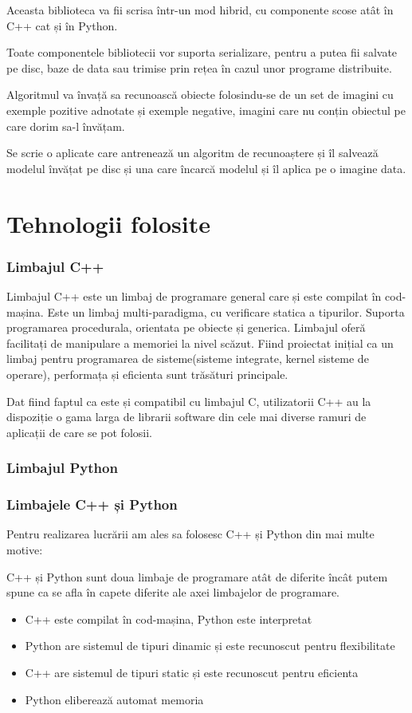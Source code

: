 Aceasta biblioteca va fii scrisa într-un mod hibrid, cu componente scose atât în C++ cat și în Python.

Toate componentele bibliotecii vor suporta serializare, pentru a putea fii salvate pe disc, baze de data sau trimise prin rețea în cazul unor programe distribuite.

Algoritmul va învață sa recunoască obiecte folosindu-se de un set de imagini cu exemple pozitive adnotate și exemple negative, imagini care nu conțin obiectul pe care dorim sa-l învățam.

Se scrie o aplicate care antrenează un algoritm de recunoaștere și îl salvează modelul învățat pe disc și una care încarcă modelul și îl aplica pe o imagine data.


\section{Tehnologii folosite}

\subsubsection{Limbajul C++}

Limbajul C++ este un limbaj de programare general care și este compilat în cod-mașina.
Este un limbaj multi-paradigma, cu verificare statica a tipurilor. 
Suporta programarea procedurala, orientata pe obiecte și generica.
Limbajul oferă facilitați de manipulare a memoriei la nivel scăzut.
Fiind proiectat inițial ca un limbaj pentru programarea de sisteme(sisteme integrate, kernel sisteme de operare), performața și eficienta sunt trăsături principale.

Dat fiind faptul ca este și compatibil cu limbajul C, utilizatorii C++ au la dispoziție o gama larga de librarii software din cele mai diverse ramuri de aplicații de care se pot folosii.

\subsubsection{Limbajul Python}



\subsubsection{Limbajele C++ și Python}
Pentru realizarea lucrării am ales sa folosesc C++ și Python din mai multe motive:

C++ și Python sunt doua limbaje de programare atât de diferite încât putem spune ca se afla în capete diferite ale axei limbajelor de programare.
\begin{itemize}
	\item C++ este compilat în cod-mașina, Python este interpretat
	\item Python are sistemul de tipuri dinamic și este recunoscut pentru flexibilitate
	\item C++ are sistemul de tipuri static și este recunoscut pentru eficienta
	\item Python eliberează automat memoria
\end{itemize}

